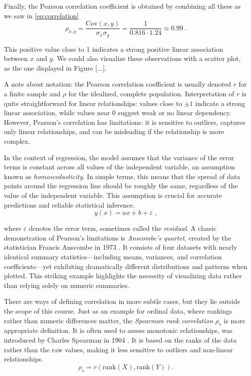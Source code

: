 \documentclass{book}
\begin{document}
Finally, the Pearson correlation coefficient is obtained by combining all these as we saw in \eqref{eq:correlation}
\begin{equation}
	\rho_{x, y} = \frac{\mathrm{Cov}(x, y)}{\sigma_x \sigma_y}  = \frac{1}{0.816 \cdot 1.24} \approx 0.99 \; .
\end{equation}

This positive value close to 1 indicates a strong positive linear association between $x$ and $y$. We could also visualize these observations with a scatter plot, as the one displayed in Figure [...].

\medskip

A note about notation: the Pearson correlation coefficient is usually denoted $r$ for a finite sample and $\rho$ for the idealized, complete population. Interpretation of $r$ is quite straightforward for linear relationships: values close to $\pm 1$ indicate a strong linear association, while values near $0$ suggest weak or no linear dependency. However, Pearson's correlation has limitations: it is sensitive to outliers, captures only linear relationships, and can be misleading if the relationship is more complex. 

In the context of regression, the model assumes that the variance of the error terms is constant across all values of the independent variable, an assumption known as \textit{homoscedasticity}. In simple terms, this means that the spread of data points around the regression line should be roughly the same, regardless of the value of the independent variable. This assumption is crucial for accurate predictions and reliable statistical inference.
\begin{equation}
	y(x) = a x + b + \varepsilon \; ,
	\label{eq:linear_error}
\end{equation}

where $\varepsilon$ denotes the error term, sometimes called the \textit{residual}. A classic demonstration of Pearson's limitations is \textit{Anscombe's quartet}, created by the statistician Francis Anscombe in 1973 \cite{anscombe1973graphs}. It consists of four datasets with nearly identical summary statistics—including means, variances, and correlation coefficients—yet exhibiting dramatically different distributions and patterns when plotted. This striking example highlights the necessity of visualizing data rather than relying solely on numeric summaries.

\medskip

There are ways of defining correlation in more subtle cases, but they lie outside the scope of this course. Just as an example for ordinal data, where rankings rather than numeric differences matter, the \textit{Spearman rank correlation} $\rho_s$ is more appropriate definition. It is often used to assess monotonic relationships, was introduced by Charles Spearman in 1904 \cite{spearman1904}. It is based on the ranks of the data rather than the raw values, making it less sensitive to outliers and non-linear relationships.\begin{equation}
	\rho_s = r(\mathrm{rank}(X), \mathrm{rank}(Y)).
	\label{eq:spearman}
\end{equation}
\end{document}
